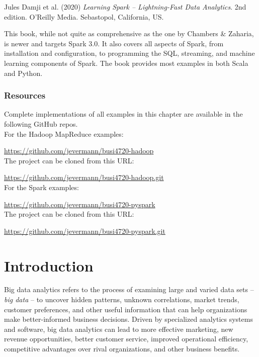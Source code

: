 \begin{tcolorbox}[colback=alert]
Jules Damji et al. (2020) \emph{Learning Spark -- Lightning-Fast Data Analytics}. 2nd edition. O'Reilly Media. Sebastopol, California, US.
\end{tcolorbox}

This book, while not quite as comprehensive as the one by Chambers \& Zaharia, is newer and targets Spark 3.0. It also covers all aspects of Spark, from installation and configuration, to programming the SQL, streaming, and machine learning components of Spark. The book provides most examples in both Scala and Python.

\begin{tcolorbox}[colback=alert]
\subsubsection*{Resources}
Complete implementations of all examples in this chapter are available in the following GitHub repos.\\

For the Hadoop MapReduce examples:

\url{https://github.com/jevermann/busi4720-hadoop} \\

The project can be cloned from this URL:

\url{https://github.com/jevermann/busi4720-hadoop.git} \\

For the Spark examples:

\url{https://github.com/jevermann/busi4720-pyspark} \\

The project can be cloned from this URL:

\url{https://github.com/jevermann/busi4720-pyspark.git} \\
\end{tcolorbox}

\section{Introduction}

Big data analytics refers to the process of examining large and varied data sets -- \emph{big data} -- to uncover hidden patterns, unknown correlations, market trends, customer preferences, and other useful information that can help organizations make better-informed business decisions. Driven by specialized analytics systems and software, big data analytics can lead to more effective marketing, new revenue opportunities, better customer service, improved operational efficiency, competitive advantages over rival organizations, and other business benefits.

